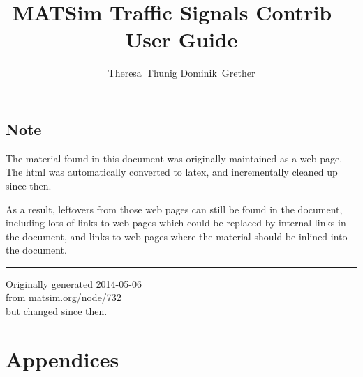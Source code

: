 \documentclass[a4paper,11pt]{report}
\newcommand{\NextFile}[1]{}
\begin{document}
\NextFile{index.html}

\title{MATSim Traffic Signals Contrib -- User Guide}

\author{%
Theresa~Thunig
Dominik~Grether
}



\vfill\eject

\section*{Note}

The material found in this document was originally maintained as a web page. The html was automatically converted to latex, and incrementally cleaned up since then.  

As a result, leftovers from those web pages can still be found in the document, including lots of links to web pages which could be replaced by internal links in the document, and links to web pages where the material should be inlined into the document.
\\
\hrule

Originally generated 2014-05-06
\\from \url{matsim.org/node/732}
\\but changed since then.



\vfill\eject

\tableofcontents




\appendix
\chapter*{Appendices}



\vfill\eject
\end{document}
